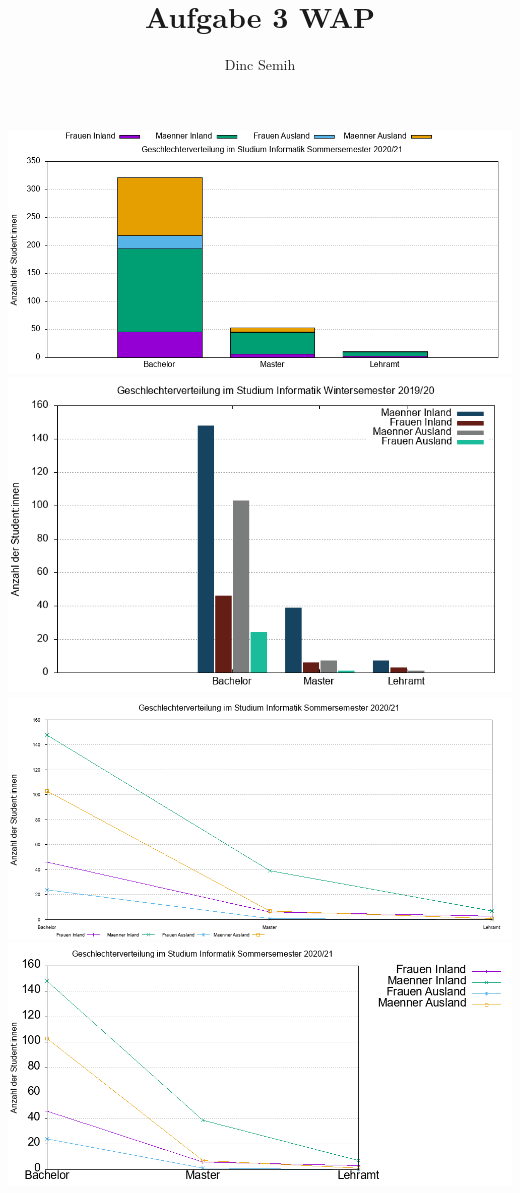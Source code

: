 \documentclass{article}
\title{Aufgabe 3 WAP}
\author{Dinc Semih}
\begin{document}
	\maketitle
	\begin{center}
		\includegraphics[scale=0.50]{graph1.png}
		\newpage
		\includegraphics[scale=0.50]{graph2.png}
		\newpage
		\includegraphics[scale=0.50]{graph3.png}
		\newpage
		\includegraphics[scale=0.50]{graph4.png}
	\end{center}
\end{document}

